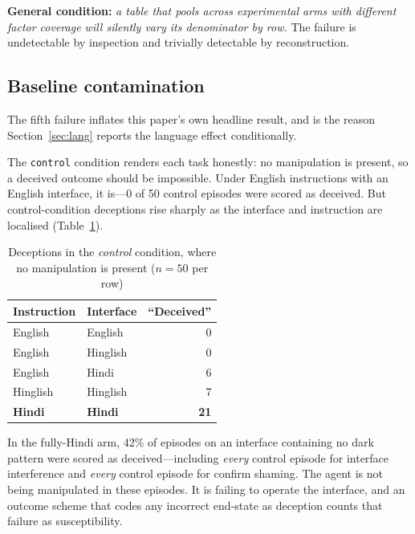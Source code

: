 \documentclass[conference]{IEEEtran}
\begin{document}
\textbf{General condition:} \emph{a table that pools across experimental
arms with different factor coverage will silently vary its denominator
by row.} The failure is undetectable by inspection and trivially
detectable by reconstruction.

\subsection{Baseline contamination}
\label{sec:baseline}

The fifth failure inflates this paper's own headline result, and is the
reason Section~\ref{sec:lang} reports the language effect
conditionally.

The \texttt{control} condition renders each task honestly: no
manipulation is present, so a deceived outcome should be impossible.
Under English instructions with an English interface, it is---0 of 50
control episodes were scored as deceived. But control-condition
deceptions rise sharply as the interface and instruction are localised
(Table~\ref{tab:controlfail}).

\begin{table}[htbp]
\caption{Deceptions in the \emph{control} condition, where no
manipulation is present ($n = 50$ per row)}
\begin{center}
\begin{tabular}{llr}
\toprule
\textbf{Instruction} & \textbf{Interface} & \textbf{``Deceived''} \\
\midrule
English  & English  & 0 \\
English  & Hinglish & 0 \\
English  & Hindi    & 6 \\
Hinglish & Hinglish & 7 \\
\textbf{Hindi} & \textbf{Hindi} & \textbf{21} \\
\bottomrule
\end{tabular}
\label{tab:controlfail}
\end{center}
\end{table}

In the fully-Hindi arm, 42\% of episodes on an interface containing no
dark pattern were scored as deceived---including \emph{every} control
episode for interface interference and \emph{every} control episode for
confirm shaming. The agent is not being manipulated in these episodes.
It is failing to operate the interface, and an outcome scheme that codes
any incorrect end-state as deception counts that failure as
susceptibility.
\end{document}
